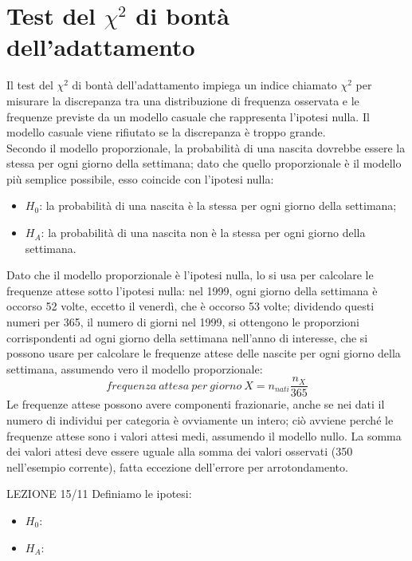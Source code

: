 \documentclass[10pt, draft]{book}
\newcommand{\tightlist}{%
\setlength{\itemsep}{1pt}\setlength{\parskip}{0pt}\setlength{\parsep}{0pt}}
\newcounter{example}[section]
\begin{document}
\section{Test del \texorpdfstring{$\chi^2$}{Lg} di bontà dell'adattamento}

Il test del $\chi^2$ di bontà dell'adattamento impiega un indice chiamato $\chi^2$ per misurare la discrepanza tra una distribuzione di frequenza osservata e le frequenze previste da un modello casuale che rappresenta l'ipotesi nulla. Il modello casuale viene rifiutato se la discrepanza è troppo grande.
\\
Secondo il modello proporzionale, la probabilità di una nascita dovrebbe essere la stessa per ogni giorno della settimana; dato che quello proporzionale è il modello più semplice possibile, esso coincide con l'ipotesi nulla:
\begin{itemize} \tightlist
\item $H_0$: la probabilità di una nascita è la stessa per ogni giorno della settimana;
\item $H_A$: la probabilità di una nascita non è la stessa per ogni giorno della settimana.
\end{itemize}
Dato che il modello proporzionale è l'ipotesi nulla, lo si usa per calcolare le frequenze attese sotto l'ipotesi nulla: nel 1999, ogni giorno della settimana è occorso 52 volte, eccetto il venerdì, che è occorso 53 volte; dividendo questi numeri per 365, il numero di giorni nel 1999, si ottengono le proporzioni corrispondenti ad ogni giorno della settimana nell'anno di interesse, che si possono usare per calcolare le frequenze attese delle nascite per ogni giorno della settimana, assumendo vero il modello proporzionale:
\begin{equation}
frequenza \ attesa \ per \ giorno \ X = n_{nati} \frac{n_X}{365}
\end{equation}
Le frequenze attese possono avere componenti frazionarie, anche se nei dati il numero di individui per categoria è ovviamente un intero; ciò avviene perché le frequenze attese sono i valori attesi medi, assumendo il modello nullo. La somma dei valori attesi deve essere uguale alla somma dei valori osservati (350 nell'esempio corrente), fatta eccezione dell'errore per arrotondamento.
\begin{example}
    LEZIONE 15/11
    Definiamo le ipotesi:
    \begin{itemize} \tightlist
    \item $H_0$:
    \item $H_A$:
    \end{itemize}
\end{example}
\end{document}
